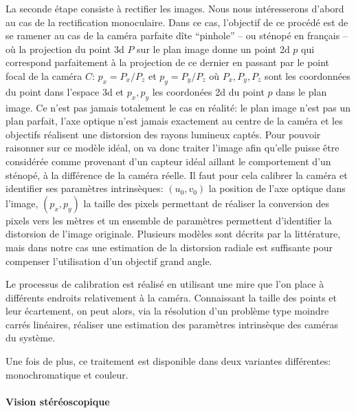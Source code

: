 La seconde étape consiste à rectifier les images. Nous nous
intéresserons d'abord au cas de la rectification monoculaire. Dans ce
cas, l'objectif de ce procédé est de se ramener au cas de la caméra
parfaite dîte ``pinhole'' -- ou sténopé en français -- où la
projection du point 3d $P$ sur le plan image donne un point 2d $p$ qui
correspond parfaitement à la projection de ce dernier en passant par
le point focal de la caméra $C$: $p_x = P_x / P_z$ et $p_y = P_y /
P_z$ où $P_x, P_y, P_z$ sont les coordonnées du point dans l'espace 3d
et $p_x, p_y$ les coordonées 2d du point $p$ dans le plan image. Ce
n'est pas jamais totalement le cas en réalité: le plan image n'est pas
un plan parfait, l'axe optique n'est jamais exactement au centre de la
caméra et les objectifs réalisent une distorsion des rayons lumineux
captés. Pour pouvoir raisonner sur ce modèle idéal, on va donc traiter
l'image afin qu'elle puisse être considérée comme provenant d'un
capteur idéal aillant le comportement d'un sténopé, à la différence de
la caméra réelle. Il faut pour cela calibrer la caméra et identifier
ses paramètres intrinsèques: $(u_0, v_0)$ la position de l'axe optique
dans l'image, $(p_x, p_y)$ la taille des pixels permettant de réaliser
la conversion des pixels vers les mètres et un ensemble de paramètres
permettent d'identifier la distorsion de l'image originale. Plusieurs
modèles sont décrits par la littérature, mais dans notre cas une
estimation de la distorsion radiale est suffisante pour compenser
l'utilisation d'un objectif grand angle.


Le processus de calibration est réalisé en utilisant une mire que l'on
place à différents endroits relativement à la caméra. Connaissant la
taille des points et leur écartement, on peut alors, via la résolution
d'un problème type moindre carrés linéaires, réaliser une estimation
des paramètres intrinsèque des caméras du système.

Une fois de plus, ce traitement est disponible dans deux variantes
différentes: monochromatique et couleur.


\paragraph{Vision stéréoscopique}


